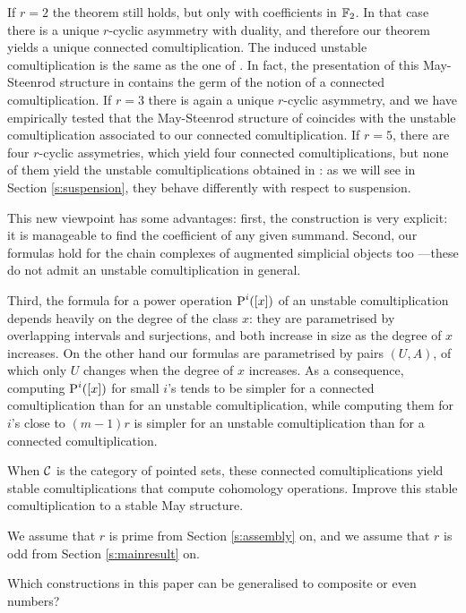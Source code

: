 If $r=2$ the theorem still holds, but only with coefficients in $\mathbb{F}_2$. In that case there is a unique $r$-cyclic asymmetry with duality, and therefore our theorem yields a unique connected comultiplication. The induced unstable comultiplication is the same as the one of \cite{medina2021may_st}. In fact, the presentation of this May-Steenrod structure in \cite{medina2021fast_sq} contains the germ of the notion of a connected comultiplication. If $r=3$ there is again a unique $r$-cyclic asymmetry, and we have empirically tested that the May-Steenrod structure of \cite{medina2021may_st} coincides with the unstable comultiplication associated to our connected comultiplication. If $r= 5$, there are four $r$-cyclic assymetries, which yield four connected comultiplications, but none of them yield the unstable comultiplications obtained in \cite{medina2021may_st}: as we will see in Section \ref{s:suspension}, they behave differently with respect to suspension.

This new viewpoint has some advantages: first, the construction is very explicit: it is manageable to find the coefficient of any given summand. %
 Second, our formulas hold for the chain complexes of augmented simplicial objects too ---these do not admit an unstable comultiplication in general. %

Third, the formula for a power operation $\operatorname{P}^i([x])$ of an unstable comultiplication depends heavily on the degree of the class $x$: they are parametrised by overlapping intervals and surjections, and both increase in size as the degree of $x$ increases. On the other hand our formulas are parametrised by pairs $(U,A)$, of which only $U$ changes when the degree of $x$ increases. As a consequence, computing $\operatorname{P}^i([x])$ for small $i$'s tends to be simpler for a connected comultiplication than for an unstable comultiplication, while computing them for $i$'s close to $(m-1)r$ is simpler for an unstable comultiplication than for a connected comultiplication.
\begin{question}
	When $\mathcal{C}$ is the category of pointed sets, these connected comultiplications yield stable comultiplications that compute cohomology operations. Improve this stable comultiplication to a stable May structure.
\end{question}
We assume that $r$ is prime from Section \ref{s:assembly} on, and we assume that $r$ is odd from Section \ref{s:mainresult} on. 
\begin{question}
		Which constructions in this paper can be generalised to composite or even numbers?
\end{question}


